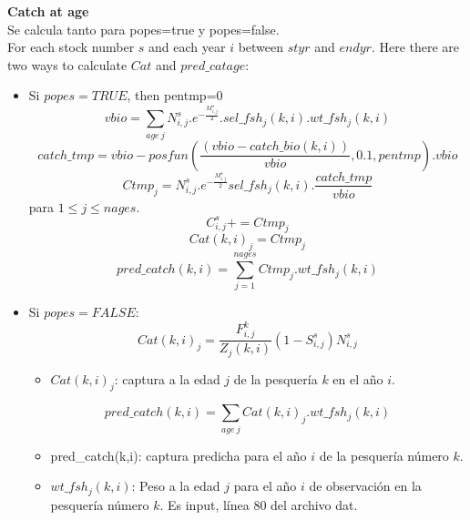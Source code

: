 \documentclass{article}
\begin{document}
\textbf{Catch at age}\\
Se calcula tanto para popes=true y popes=false.\\
For each stock number $s$ and  each year $i$ between $styr$ and $endyr$. Here there are two ways to calculate $Cat$ and $pred\_catage$:
\begin{itemize}
    \item Si $popes=TRUE$, then pentmp=0
        \begin{equation}
        vbio=\sum_{age\ j}N^s_{i,j}.e^{-\frac{M^s_{i,j}}{2}}.sel\_fsh_j(k,i).wt\_fsh_j(k,i)
    \end{equation}
        \begin{equation}
        catch\_tmp=vbio-posfun\left(\frac{(vbio - catch\_bio(k,i))}{vbio} , 0.1 , pentmp \right).vbio
    \end{equation}
    \begin{equation}
        Ctmp_j=N^s_{i,j}.e^{-\frac{M^s_{i,j}}{2}}sel\_fsh_j(k,i).\dfrac{catch\_tmp}{vbio}
    \end{equation}
    para $1\leq j \leq nages$.
    \begin{equation}
        C^s_{i,j}+=Ctmp_j
    \end{equation}
    \begin{equation}
        Cat(k,i)_j=Ctmp_j
    \end{equation}
    \begin{equation}
            pred\_catch(k,i)=\sum_{j=1}^{nages}Ctmp_j.wt\_fsh_j(k,i)
        \end{equation}
    \item Si $popes=FALSE$:
     \begin{equation}
        Cat(k,i)_j=\dfrac{F^k_{i,j}}{Z_j(k,i)}\left(1-S^s_{i,j}\right)N^s_{i,j}
    \end{equation}
    \begin{itemize}
        \item $Cat(k,i)_j$: captura a la edad $j$ de la pesquería $k$ en el año $i$.
    \end{itemize}
      \begin{equation}
        pred\_catch(k,i)=\sum_{age \ j}Cat(k,i)_j.wt\_fsh_j(k,i)
    \end{equation}
    \begin{itemize}
        \item pred\_catch(k,i): captura predicha para el año $i$ de la pesquería número $k$.
        \item $wt\_fsh_j(k,i)$: Peso a la edad $j$ para el año $i$ de observación en la pesquería número $k$. Es input, línea 80 del archivo dat.

\end{itemize}
\end{itemize}
\end{document}

